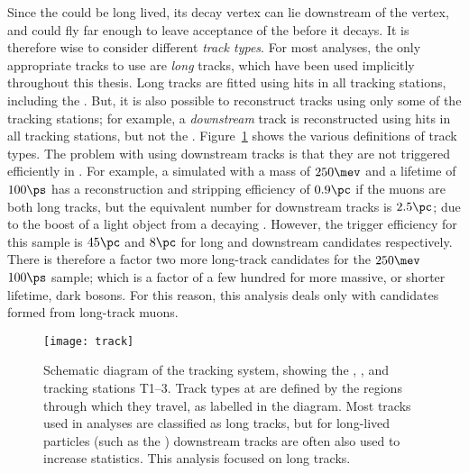 Since the \db could be long lived, its decay vertex can lie downstream of the \Bd vertex, and could
fly far enough to leave acceptance of the \velo before it decays.
It is therefore wise to consider different \emph{track types}.
For most \lhcb analyses, the only appropriate tracks to use are \emph{long} tracks, which
have been used implicitly throughout this thesis.
Long tracks are fitted using hits in all tracking stations, including the \velo.
But, it is also possible to reconstruct tracks using only some of the tracking stations; for
example, a \emph{downstream} track is reconstructed using hits in all tracking stations, but not
the \velo.
Figure~\ref{fig:db:lldd} shows the various definitions of track types.
The problem with using downstream tracks is that they are not triggered efficiently in \hlttwo.
For example, a simulated \db with a mass of $250\mev$ and a lifetime of $100\ps$ has a
reconstruction and
stripping efficiency of \approx$0.9\pc$ if the muons are both long tracks, but the equivalent
number for downstream tracks is \approx$2.5\pc$; due to the boost of a light object from a decaying
\Bd.
However, the trigger efficiency for this sample is \approx$45\pc$ and $8\pc$ for long and
downstream candidates respectively.
There is therefore a factor two more long-track candidates for the $250\mev$ $100\ps$ sample; which
is a factor of a few hundred for more massive, or shorter lifetime, dark bosons.
For this reason, this analysis deals only with \db candidates formed from long-track muons.

\begin{figure}
  \begin{center}
    \texttt{[image: track]}
    \caption[Track definitions in the LHCb detector]
    {
      Schematic diagram of the \lhcb tracking system, showing the \velo, \ttracker, and tracking
      stations T1--3.
      Track types at \lhcb are defined by the regions through which they travel, as labelled in the
      diagram.
      Most tracks used in analyses are classified as long tracks, but for long-lived particles
      (such as the \KS) downstream tracks are often also used to increase statistics.
      This analysis focused on long tracks.
    }
    \label{fig:db:lldd}
  \end{center}
\end{figure}




